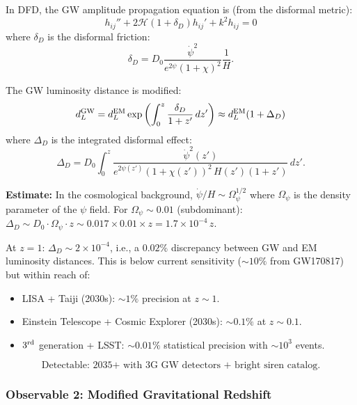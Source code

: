 \documentclass[11pt,a4paper]{article}
\begin{document}
In DFD, the GW amplitude propagation equation is (from the disformal metric):
\begin{equation}
h_{ij}'' + 2\mathcal{H}(1 + \delta_D)h_{ij}' + k^2 h_{ij} = 0
\end{equation}
where $\delta_D$ is the disformal friction:
\begin{equation}
\delta_D = D_0\frac{\dot\psi^2}{e^{2\psi}(1+\chi)^2}\frac{1}{H}.
\end{equation}

The GW luminosity distance is modified:
\begin{equation}
d_L^{\rm GW} = d_L^{\rm EM}\exp\left(\int_0^z\frac{\delta_D}{1+z'}\,dz'\right) \approx d_L^{\rm EM}(1 + \Delta_D)
\end{equation}
where $\Delta_D$ is the integrated disformal effect:
\begin{equation}\label{eq:DeltaD}
\Delta_D = D_0\int_0^z\frac{\dot\psi^2(z')}{e^{2\psi(z')}(1+\chi(z'))^2\,H(z')(1+z')}\,dz'.
\end{equation}

\textbf{Estimate:} In the cosmological background, $\dot\psi/H \sim \Omega_\psi^{1/2}$ where $\Omega_\psi$ is the density parameter of the $\psi$ field. For $\Omega_\psi \sim 0.01$ (subdominant): $\Delta_D \sim D_0 \cdot \Omega_\psi \cdot z \sim 0.017 \times 0.01 \times z = 1.7\times 10^{-4}\,z$.

At $z = 1$: $\Delta_D \sim 2 \times 10^{-4}$, i.e., a $0.02\%$ discrepancy between GW and EM luminosity distances. This is below current sensitivity ($\sim 10\%$ from GW170817) but within reach of:
\begin{itemize}
\item LISA + Taiji (2030s): $\sim 1\%$ precision at $z \sim 1$.
\item Einstein Telescope + Cosmic Explorer (2030s): $\sim 0.1\%$ at $z \sim 0.1$.
\item $3^{\rm rd}$ generation + LSST: $\sim 0.01\%$ statistical precision with $\sim 10^3$ events.
\end{itemize}

\begin{equation}
\boxed{\text{Detectable: 2035+ with 3G GW detectors + bright siren catalog.}}
\end{equation}

\subsubsection{Observable 2: Modified Gravitational Redshift}
\end{document}
